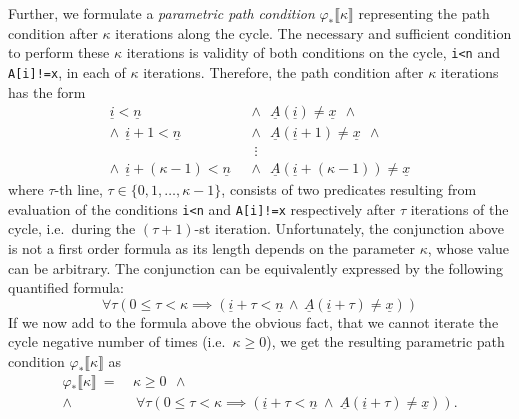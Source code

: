 \documentclass{sig-alternate}%
\newcommand{\var}[1]{{\tt #1}}
\newcommand{\sym}[1]{\ensuremath{\underline{#1}}}
\newcommand{\prm}[1]{\ensuremath{\llbracket #1 \rrbracket}}
\begin{document}
Further, we formulate a \emph{parametric path condition}
$\varphi_*\prm{\kappa}$ representing the path condition after $\kappa$
iterations along the cycle. The necessary and sufficient condition to perform
these $\kappa$ iterations is validity of both conditions on the cycle,
\texttt{i<n} and \texttt{A[i]!=x}, in each of $\kappa$ iterations. %
Therefore, the path condition after $\kappa$ iterations has the form
\begin{align*}
  \sym{i}<\sym{n}&~~\wedge~~\sym{A}(\sym{i})\not=\sym{x}~~\wedge\\
  \wedge~~\sym{i}+1<\sym{n}&~~\wedge~~\sym{A}(\sym{i}+1)\not=\sym{x}~~\wedge\\
  &~~~~\vdots\\
  \wedge~~\sym{i}+(\kappa-1)<\sym{n}&~~\wedge~~\sym{A}(\sym{i}+(\kappa-1))\not=\sym{x}
\end{align*}
where $\tau$-th line, $\tau\in\{0,1,\ldots,\kappa-1\}$, consists of two
predicates resulting from evaluation of the conditions \texttt{i<n} and
\texttt{A[i]!=x} respectively after $\tau$ iterations of the cycle,
i.e.~during the $(\tau+1)$-st iteration. Unfortunately, the conjunction
above is not a first order formula as its length depends on the parameter
$\kappa$, whose value can be arbitrary. The conjunction can be equivalently
expressed by the following quantified formula:
\[
  \forall\tau(0\le\tau<\kappa\implies
  (\sym{i}+\tau<\sym{n}\,\wedge\,\sym{A}(\sym{i}+\tau)\neq\sym{x}))
\]
If we now add to the formula above the obvious fact, that we cannot
iterate the cycle negative number of times (i.e.~$\kappa \geq 0$), we
get the resulting parametric path condition $\varphi_*\prm{\kappa}$ as
\begin{align*}
  \varphi_*\prm{\kappa}~=~&\kappa\ge0~~\wedge\\
  \wedge~&~\forall\tau(0\le\tau<\kappa\implies
  (\sym{i}+\tau<\sym{n}~\wedge~\sym{A}(\sym{i}+\tau)\neq\sym{x})).
\end{align*}
\end{document}
